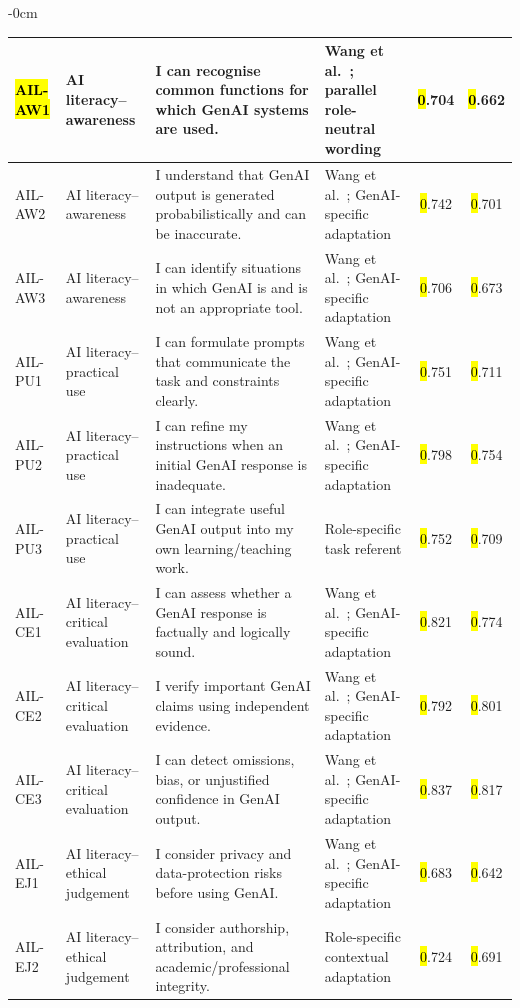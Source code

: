 \documentclass[sustainability,article,accept,moreauthors]{Definitions/mdpi}
\begin{document}
\begin{table}[H]
\begin{adjustwidth}{-\extralength}{0cm}
\begin{tabular}{p{1.2cm}p{4cm}p{5cm}p{4cm}cc}
\hl{AIL-AW1} %
 & AI literacy--awareness & I can recognise common functions for which GenAI systems are used. & Wang et al.~\cite{wang2023}; parallel role-neutral wording &\hl{0}.704 &\hl{0}.662 \\\midrule
AIL-AW2 & AI literacy--awareness & I understand that GenAI output is generated probabilistically and can be inaccurate. & Wang et al.~\cite{wang2023}; GenAI-specific adaptation &\hl{0}.742 &\hl{0}.701 \\\midrule
AIL-AW3 & AI literacy--awareness & I can identify situations in which GenAI is and is not an appropriate tool. & Wang et al.~\cite{wang2023}; GenAI-specific adaptation &\hl{0}.706 &\hl{0}.673 \\\midrule
AIL-PU1 & AI literacy--practical use & I can formulate prompts that communicate the task and constraints clearly. & Wang et al.~\cite{wang2023}; GenAI-specific adaptation &\hl{0}.751 &\hl{0}.711 \\\midrule
AIL-PU2 & AI literacy--practical use & I can refine my instructions when an initial GenAI response is inadequate. & Wang et al.~\cite{wang2023}; GenAI-specific adaptation &\hl{0}.798 &\hl{0}.754 \\\midrule
AIL-PU3 & AI literacy--practical use & I can integrate useful GenAI output into my own learning/teaching work. & Role-specific task referent &\hl{0}.752 &\hl{0}.709 \\\midrule
AIL-CE1 & AI literacy--critical evaluation & I can assess whether a GenAI response is factually and logically sound. & Wang et al.~\cite{wang2023}; GenAI-specific adaptation &\hl{0}.821 &\hl{0}.774 \\\midrule
AIL-CE2 & AI literacy--critical evaluation & I verify important GenAI claims using independent evidence. & Wang et al.~\cite{wang2023}; GenAI-specific adaptation &\hl{0}.792 &\hl{0}.801 \\\midrule
AIL-CE3 & AI literacy--critical evaluation & I can detect omissions, bias, or unjustified confidence in GenAI output. & Wang et al.~\cite{wang2023}; GenAI-specific adaptation &\hl{0}.837 &\hl{0}.817 \\\midrule
AIL-EJ1 & AI literacy--ethical judgement & I consider privacy and data-protection risks before using GenAI. & Wang et al.~\cite{wang2023}; GenAI-specific adaptation &\hl{0}.683 &\hl{0}.642 \\\midrule
AIL-EJ2 & AI literacy--ethical judgement & I consider authorship, attribution, and academic/professional integrity. & Role-specific contextual adaptation &\hl{0}.724 &\hl{0}.691 \\\midrule

\end{tabular}
\end{adjustwidth}
\end{table}
\end{document}
